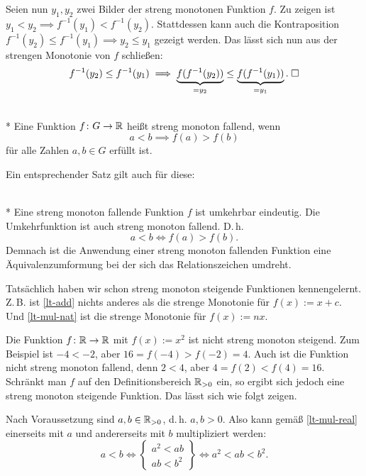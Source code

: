 Seien nun $y_1,y_2$ zwei Bilder der streng monotonen Funktion $f$.
Zu zeigen ist $y_1<y_2\implies f^{-1}(y_1)<f^{-1}(y_2)$.
Stattdessen kann auch die Kontraposition
$f^{-1}(y_2)\le f^{-1}(y_1)\implies y_2\le y_1$ gezeigt werden.
Das lässt sich nun aus der strengen Monotonie von $f$ schließen:
\begin{equation}
f^{-1}(y_2)\le f^{-1}(y_1)\implies
\underbrace{f(f^{-1}(y_2))}_{=y_2}\le \underbrace{f(f^{-1}(y_1))}_{=y_1}.\;\Box
\end{equation}

\begin{Definition}\mbox{}\\*
Eine Funktion $f\colon G\to\mathbb R$ heißt streng monoton fallend, wenn
\[a<b\implies f(a)>f(b)\]
für alle Zahlen $a,b\in G$ erfüllt ist.
\end{Definition}

\noindent
Ein entsprechender Satz gilt auch für diese:
\begin{Satz}\mbox{}\\*
Eine streng monoton fallende Funktion $f$ ist umkehrbar eindeutig.
Die Umkehrfunktion ist auch streng monoton fallend. D.\,h.
\[a<b\iff f(a)>f(b).\]
Demnach ist die Anwendung einer streng monoton fallenden
Funktion eine Äquivalenzumformung bei der sich das Relationszeichen
umdreht.
\end{Satz}

\noindent
Tatsächlich haben wir schon streng monoton steigende Funktionen
kennengelernt. Z.\,B. ist \eqref{lt-add} nichts anderes als die strenge
Monotonie für $f(x):=x+c$. Und \eqref{lt-mul-nat} ist die strenge
Monotonie für $f(x):=nx$.

Die Funktion $f\colon\mathbb R\to\mathbb R$ mit $f(x):=x^2$ ist nicht streng monoton
steigend. Zum Beispiel ist $-4<-2$, aber $16=f(-4)>f(-2)=4$. Auch
ist die Funktion nicht streng monoton fallend, denn $2<4$,
aber $4=f(2)<f(4)=16$. Schränkt man $f$
auf den Definitionsbereich $\mathbb R_{>0}$ ein, so ergibt sich jedoch eine
streng monoton steigende Funktion. Das lässt sich wie folgt zeigen.

Nach Voraussetzung sind $a,b\in\mathbb R_{>0}$, d.\,h. $a,b>0$.
Also kann gemäß \eqref{lt-mul-real} einerseits mit $a$
und andererseits mit $b$ multipliziert werden:
\[
a<b\iff\begin{Bmatrix}
a^2<ab\\
ab<b^2
\end{Bmatrix}
\iff a^2<ab<b^2.
\]


